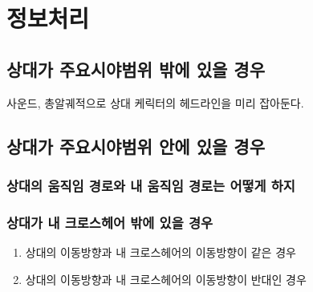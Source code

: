 \section{정보처리}
\subsection{상대가 주요시야범위 밖에 있을 경우}
사운드, 총알궤적으로 상대 케릭터의 헤드라인을 미리 잡아둔다.
\subsection{상대가 주요시야범위 안에 있을 경우}
\subsubsection{상대의 움직임 경로와 내 움직임 경로는 어떻게 하지}
\subsubsection{상대가 내 크로스헤어 밖에 있을 경우}
\begin{enumerate}
    \item 상대의 이동방향과 내 크로스헤어의 이동방향이 같은 경우
    \item 상대의 이동방향과 내 크로스헤어의 이동방향이 반대인 경우
\end{enumerate}
